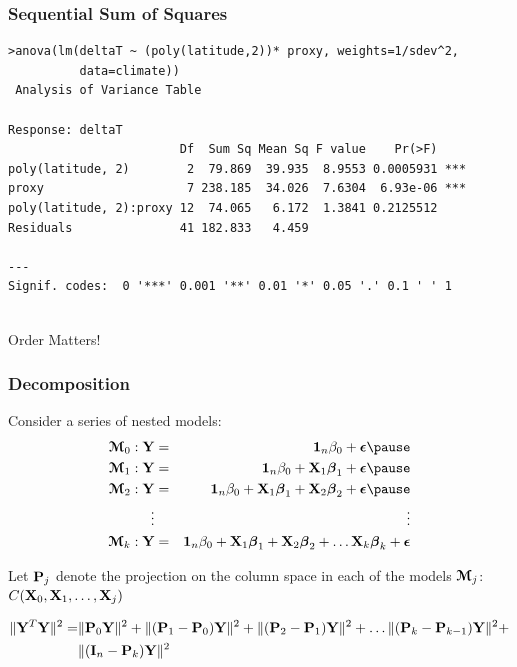 \documentclass[]{beamer}
\begin{document}
\begin{frame}[fragile]
 \frametitle{Sequential Sum of Squares}
   \begin{small}
\begin{verbatim}
>anova(lm(deltaT ~ (poly(latitude,2))* proxy, weights=1/sdev^2,
          data=climate))
 Analysis of Variance Table

Response: deltaT
                        Df  Sum Sq Mean Sq F value    Pr(>F)    
poly(latitude, 2)        2  79.869  39.935  8.9553 0.0005931 ***
proxy                    7 238.185  34.026  7.6304  6.93e-06 ***
poly(latitude, 2):proxy 12  74.065   6.172  1.3841 0.2125512    
Residuals               41 182.833   4.459                      
                   
---
Signif. codes:  0 '***' 0.001 '**' 0.01 '*' 0.05 '.' 0.1 ' ' 1 
 
\end{verbatim}
\end{small}
Order Matters!
\end{frame}
\begin{frame}
  \frametitle{Decomposition}
  Consider a series of nested models: \pause
  \begin{eqnarray*}
    \M_0: \Y & = & \one_n \beta_0 + \eps   \pause\\
\M_1: \Y & = & \one_n \beta_0 + \X_1 \b_1 + \eps  \pause \\
\M_2: \Y & = & \one_n \beta_0 + \X_1 \b_1 + \X_2 \b_2 + \eps   \pause\\
\vdots & & \vdots \\
\M_k: \Y & = & \one_n \beta_0 + \X_1 \b_1 + \X_2 \b_2 + \ldots \X_k \b_k + \eps 
  \end{eqnarray*} \pause

Let $\P_j$ denote the projection on the column space in each of the
models $\M_j$: $C(\X_0, \X_1, \ldots, \X_j)$ \pause
\begin{small}
  \begin{align*}
\| \Y^T\Y \|^2 =&  \| \P_0 \Y\|^2 + \| (\P_1 - \P_0) \Y \|^2 + \|(\P_2
- \P_1)\Y\|^2 + \ldots \| (\P_k - \P_{k-1})\Y \|^2 + \\ 
& \|(\I_n -
\P_k)\Y\|^2
 \end{align*}
\end{small}

\end{frame}
\end{document}
